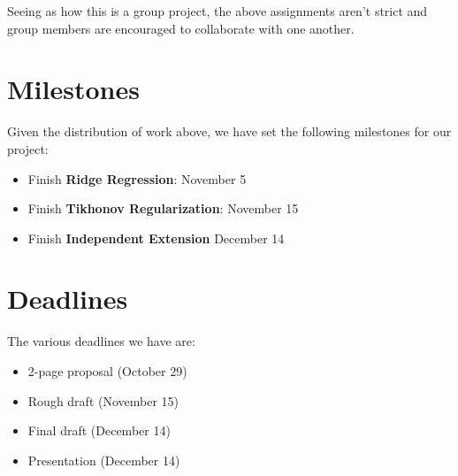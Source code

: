 \documentclass{article}
\begin{document}
    Seeing as how this is a group project, the above assignments aren't strict and group members are encouraged to collaborate with one another.

    \section{Milestones}

    Given the distribution of work above, we have set the following milestones for our project:

    \begin{itemize}
        \item Finish \textbf{Ridge Regression}: November 5
        \item Finish \textbf{Tikhonov Regularization}: November 15
        \item Finish \textbf{Independent Extension} December 14
    \end{itemize}

    \section{Deadlines}

    The various deadlines we have are:

    \begin{itemize}
        \item 2-page proposal (October 29)
        \item Rough draft (November 15)
        \item Final draft (December 14)
        \item Presentation (December 14)
    \end{itemize}
\end{document}

